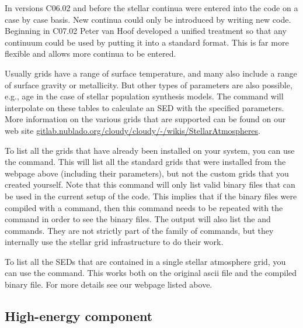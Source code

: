 In versions C06.02 and before the stellar continua were entered into
the code on a case by case basis.
New continua could only be introduced
by writing new code.
Beginning in C07.02 Peter van Hoof developed a unified
treatment so that any continuum could be used by putting
it into a standard format.
This is far more flexible and allows more continua to be entered.

Usually grids have a range of surface temperature, and many also include a
range of surface gravity or metallicity. But other types of parameters are
also possible, e.g., age in the case of stellar population synthesis models.
The  command will interpolate on these tables to
calculate an SED with the specified parameters. More information on the
various grids that are supported can be found on our web site
\href{https://gitlab.nublado.org/cloudy/cloudy/-/wikis/StellarAtmospheres}{gitlab.nublado.org/cloudy/cloudy/-/wikis/StellarAtmospheres}.

To list all the grids that have already been installed on your system, you can
use the  command. This will list all the
standard grids that were installed from the webpage above (including their
parameters), but not the custom grids that you created yourself. Note that
this command will only list valid binary files that can be used in the current
setup of the code. This implies that if the binary files were compiled with a
 command, then this command needs to be
repeated with the  command in order
to see the binary files. The output will also list the 
and  commands. They are not strictly part of the
 family of commands, but they internally use the stellar
grid infrastructure to do their work.

To list all the SEDs that are contained in a single stellar atmosphere
grid, you can use the  command. This
works both on the original ascii file and the compiled binary file. For more
details see our webpage listed above.

\subsection{High-energy component}
\label{sec:StarHighEnergyComponent}

